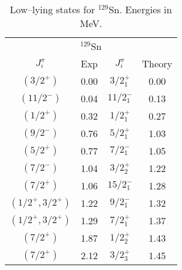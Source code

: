 \begin{table}[htbp]
\begin{center}
\begin{tabular}{cccc}
\hline 
\multicolumn{4}{c}{ $^{129}$Sn} \\ 
{$J^{\pi}_i$} &{Exp} &{$J^{\pi}_i$} &{Theory} \\
\hline 
$(3/2^{+})$         & 0.00 & $3/2^{+}_{1}$  & 0.00 \\
$(11/2^{-})$        & 0.04 & $11/2^{-}_{1}$ & 0.13 \\
$(1/2^{+})$         & 0.32 & $1/2^{+}_{1}$  & 0.27 \\
$(9/2^{-})$         & 0.76 & $5/2^{+}_{1}$  & 1.03 \\
$(5/2^{+})$         & 0.77 & $7/2^{-}_{1}$  & 1.05 \\
$(7/2^{-})$         & 1.04 & $3/2^{+}_{2}$  & 1.22 \\
$(7/2^{+})$         & 1.06 & $15/2^{-}_{1}$ & 1.28 \\
$(1/2^{+},3/2^{+})$ & 1.22 & $9/2^{-}_{1}$  & 1.32 \\
$(1/2^{+},3/2^{+})$ & 1.29 & $7/2^{+}_{1}$  & 1.37 \\
$(7/2^{+})$         & 1.87 & $1/2^{+}_{2}$  & 1.43 \\
$(7/2^{+})$         & 2.12 & $3/2^{+}_{3}$  & 1.45 \\
\hline 
\end{tabular}
\caption{Low--lying states for  $^{129}$Sn. Energies in MeV.}
\label{tab:129sn}
\end{center}
\end{table}

